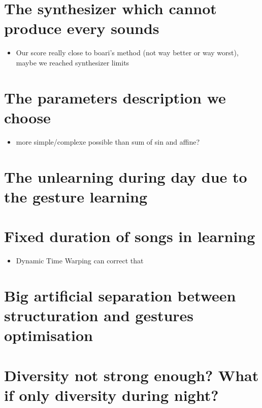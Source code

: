 \section{The synthesizer which cannot produce every
sounds}\label{the-synthesizer-which-cannot-produce-every-sounds}

\begin{itemize}
\tightlist
\item
  Our score really close to boari's method (not way better or way
  worst), maybe we reached synthesizer limits
\end{itemize}

\section{The parameters description we
choose}\label{the-parameters-description-we-choose}

\begin{itemize}
\tightlist
\item
  more simple/complexe possible than sum of sin and affine?
\end{itemize}

\section{The unlearning during day due to the gesture
learning}\label{the-unlearning-during-day-due-to-the-gesture-learning}

\section{Fixed duration of songs in
learning}\label{fixed-duration-of-songs-in-learning}

\begin{itemize}
\tightlist
\item
  Dynamic Time Warping can correct that
\end{itemize}

\section{Big artificial separation between structuration and gestures
optimisation}\label{big-artificial-separation-between-structuration-and-gestures-optimisation}

\section{Diversity not strong enough? What if only diversity during
night?}\label{diversity-not-strong-enough-what-if-only-diversity-during-night}

